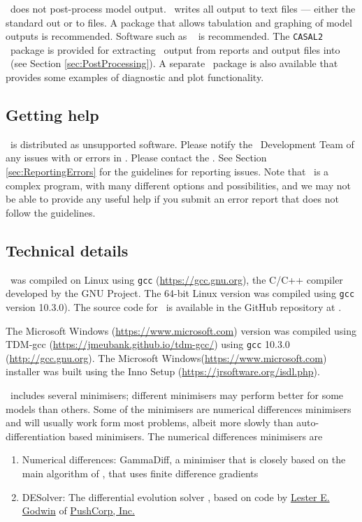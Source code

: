 \CNAME\ does not post-process model output. \CNAME\ writes all output to text files --- either the standard out or to files. A package that allows tabulation and graphing of model outputs is recommended. Software such as \href{http://www.r-project.org}{\R}\ \citep{R} is recommended. The \texttt{CASAL2} \R\ package is provided for extracting \CNAME\ output from reports and output files into \R\ (see Section \ref{sec:PostProcessing}). A separate \R\ package is also available that provides some examples of diagnostic and plot functionality.

\subsection{Getting help}

\CNAME\ is distributed as unsupported software. Please notify the \CNAME\ Development Team of any issues with or errors in \CNAME. Please contact the \emaillink. See Section \ref{sec:ReportingErrors} for the guidelines for reporting issues. Note that \CNAME\ is a complex program, with many different options and possibilities, and we may not be able to provide any useful help if you submit an error report that does not follow the guidelines. 

\subsection{Technical details}\label{sec:TechnicalDetails}

\CNAME\ was compiled on Linux using \texttt{gcc} (\url{https://gcc.gnu.org}), the C/C++ compiler developed by the GNU Project. The 64-bit Linux  version was compiled using \texttt{gcc} version 10.3.0). The source code for \CNAME\ is available in the GitHub repository at \github.

The Microsoft Windows (\url{https://www.microsoft.com}) version was compiled using TDM-gcc (\url{https://jmeubank.github.io/tdm-gcc/}) using \texttt{gcc} 10.3.0 (\url{http://gcc.gnu.org}). The Microsoft Windows(\url{https://www.microsoft.com}) installer was built using the Inno Setup (\url{https://jrsoftware.org/isdl.php}).

\CNAME\ includes several minimisers; different minimisers may perform better for some models than others. Some of the minimisers are numerical differences minimisers and will usually work form most problems, albeit more slowly than auto-differentiation based minimisers. The numerical differences minimisers are 
\begin{enumerate}
\item Numerical differences: GammaDiff, a minimiser that is closely based on the main algorithm of \cite{779}, that uses finite difference gradients
\item DESolver: The differential evolution solver \citep{1442}, based on code by \href{mailto:<godwin@pushcorp.com>}{Lester E. Godwin} of \href{http://www.pushcorp.com}{PushCorp, Inc.}
\end{enumerate}

